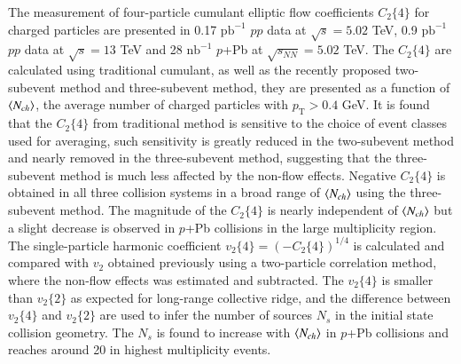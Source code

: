 The measurement of four-particle cumulant elliptic flow coefficients $C_{2}\{4\}$ for charged particles are presented in 0.17 $\text{pb}^{-1}$ $pp$ data at $\sqrt{s}=5.02$ TeV, 0.9 $\text{pb}^{-1}$ $pp$ data at $\sqrt{s}=13$ TeV and 28 $\text{nb}^{-1}$ $p$+Pb at $\sqrt{s_{NN}}=5.02$ TeV. The $C_{2}\{4\}$ are calculated using traditional cumulant, as well as the recently proposed two-subevent method and three-subevent method, they are presented as a function of $\left\langle N_{ch}\right\rangle$, the average number of charged particles with $p_{\text{T}}>0.4$ GeV. It is found that the $C_{2}\{4\}$ from traditional method is sensitive to the choice of event classes used for averaging, such sensitivity is greatly reduced in the two-subevent method and nearly removed in the three-subevent method, suggesting that the three-subevent method is much less affected by the non-flow effects. Negative $C_{2}\{4\}$ is obtained in all three collision systems in a broad range of $\left\langle N_{ch}\right\rangle$ using the three-subevent method. The magnitude of the $C_{2}\{4\}$ is nearly independent of $\left\langle N_{ch}\right\rangle$ but a slight decrease is observed in $p$+Pb collisions in the large multiplicity region. The single-particle harmonic coefficient $v_{2}\{4\}=(-C_{2}\{4\})^{1/4}$ is calculated and compared with $v_{2}$ obtained previously using a two-particle correlation method, where the non-flow effects was estimated and subtracted. The $v_{2}\{4\}$ is smaller than $v_{2}\{2\}$ as expected for long-range collective ridge, and the difference between $v_{2}\{4\}$ and $v_{2}\{2\}$ are used to infer the number of sources $N_{s}$ in the initial state collision geometry. The $N_{s}$ is found to increase with $\left\langle N_{ch}\right\rangle$ in $p$+Pb collisions and reaches around 20 in highest multiplicity events.


